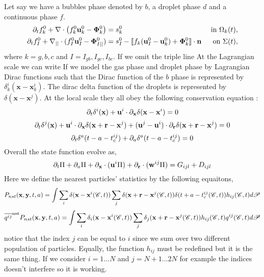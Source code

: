 Let say we have a bubbles phase denoted by $b$, a droplet phase $d$ and a continuous  phase $f$. 
\begin{align}
    \partial_t f_k^0
    +\mathbf{\nabla}\cdot \left(
        f_k^0\textbf{u}_k^0
        - \mathbf{\Phi}_k^0
        \right)
    &= 
    s_k^0
    & \text{ in } \Omega_k(t),&\\
    \partial_t f_I^0 
    +\mathbf{\nabla}_{||}\cdot
    (
        f_I^0 \textbf{u}_I^0
        - \mathbf{\Phi}_{I||}^0 
    )
    &= 
    s_I^0
    - \llbracket 
        f_k (\textbf{u}_I^0 - \textbf{u}_k^0)
        + \mathbf{\Phi}_k^0
      \rrbracket \cdot \textbf{n} 
    & \text{ on } \Sigma(t),&
\end{align}
where $k = g,b,c$ and $I = I_{gb},I_{gc},I_{bc}$.
If we omit the triple line At the Lagrangian scale we can write 
If we model the gas phase and droplet phase by Lagrangian Dirac functions such that the Dirac function of the $b$ phase is represented by $\delta_k^i(\textbf{x}- \textbf{x}^i_k)$. 
The dirac delta function of the droplets is represented by $\delta(\textbf{x} - \textbf{x}^j)$. 
At the local scale they all obey the following conservation equation : 
\begin{equation*}
    \partial_t \delta^i(\textbf{x})
    + \textbf{u}^i  \cdot \partial_{\textbf{x}} \delta(\textbf{x} - \textbf{x}^i)
    = 0 
\end{equation*}
\begin{equation*}
    \partial_t \delta^j(\textbf{x})
    + \textbf{u}^i \cdot \partial_{\textbf{x}}  \delta(\textbf{x} + \textbf{r} - \textbf{x}^j)
    + (\textbf{u}^j - \textbf{u}^i) \cdot \partial_{\textbf{r}}  \delta(\textbf{x} + \textbf{r} - \textbf{x}^j)
    = 0 
\end{equation*}
\begin{equation*}
    \partial_t \delta^a(t - a - t_c^{ij})
    + 
    \partial_a \delta^a(t - a - t_c^{ij})
    = 0 
\end{equation*}
Overall the state function evolve as, 
\begin{equation}
    \partial_t \Pi
    + \partial_a \Pi
    + \partial_{\textbf{x}} \cdot (\textbf{u}^i \Pi)
    + \partial_{\textbf{r}}  \cdot (\textbf{w}^{ij} \Pi)
    = G_{ijl}+D_{ijl}
\end{equation}
Here we define the nearest particles' statistics by the following equaitons,
\begin{equation}
    P_{nst}(\textbf{x},\textbf{y},t,a)= 
    \int \sum_{i}\delta(\textbf{x}-\textbf{x}^i(\mathscr{C},t))
    \sum_{j}\delta(\textbf{x}+\textbf{r}-\textbf{x}^j(\mathscr{C},t)) 
    \delta(t+a-t_c^{ij}(\mathscr{C},t)) 
    h_{ij}(\mathscr{C},t) d\mathscr{P} 
\end{equation}
\begin{equation}
    \overline{q^{ij}}^\text{nst}P_{nst}(\textbf{x},\textbf{y},t,a)= \int \sum_{i}\delta_i(\textbf{x}-\textbf{x}^i(\mathscr{C},t))
    \sum_{j}\delta_j(\textbf{x}+\textbf{r}-\textbf{x}^j(\mathscr{C},t)) h_{ij}(\mathscr{C},t) q^{ij}(\mathscr{C},t) d\mathscr{P} 
\end{equation}
notice that the index $j$ can be equal to $i$ since we sum over two different population of particles. 
Equally, the function $h_{ij}$ must be redefined but it is the same thing. 
If we consider $i=1\ldots N$ and $j = N+1\ldots 2N$ for example the indices doesn't interfere so it is working. 